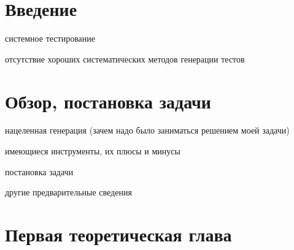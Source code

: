 \documentclass[14pt]{extreport}
\begin{document}
\pagebreak

\tableofcontents











\chapter*{Введение}
системное тестирование

отсутствие хороших систематических методов генерации тестов

\chapter{Обзор, постановка задачи}

нацеленная генерация (зачем надо было заниматься решением моей задачи)

имеющиеся инструменты, их плюсы и минусы

постановка задачи

другие предварительные сведения

\chapter{Первая теоретическая глава}
\end{document}
